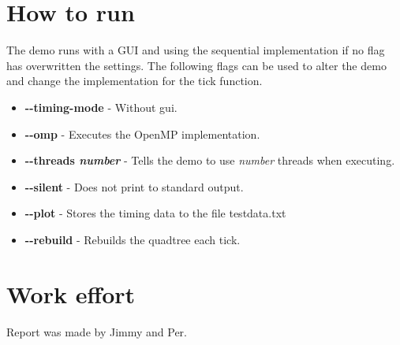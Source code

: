 \documentclass[a4paper,11pt]{article}
\begin{document}
\section{How to run}
The demo runs with a GUI and using the sequential implementation if no
flag has overwritten the settings. The following flags can be used to
alter the demo and change the implementation for the tick function.
\begin{itemize}[label=,leftmargin=0pt]
\item \textbf{-\--timing-mode} - Without gui.
\item \textbf{-\--omp} - Executes the OpenMP implementation.
\item \textbf{-\--threads \textit{number}} - Tells the demo to use
  \textit{number} threads when executing.
\item \textbf{-\--silent} - Does not print to standard output.
\item \textbf{-\--plot} - Stores the timing data to the file
  testdata.txt
\item \textbf{-\--rebuild} - Rebuilds the quadtree each tick.
\end{itemize}
\section*{Work effort}
Report was made by Jimmy and Per.
\end{document}
